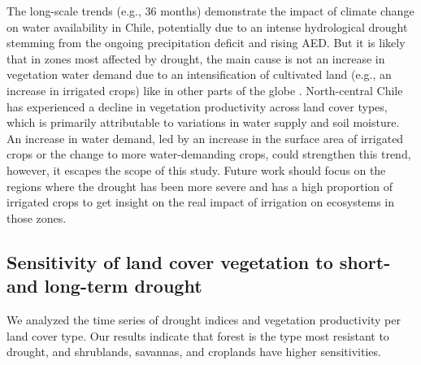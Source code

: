 \documentclass[
  authoryear,
  preprint,
  3p,
  onecolumn]{elsarticle}
\begin{document}
The long-scale trends (e.g., 36 months) demonstrate the impact of
climate change on water availability in Chile, potentially due to an
intense hydrological drought stemming from the ongoing precipitation
deficit and rising AED. But it is likely that in zones most affected by
drought, the main cause is not an increase in vegetation water demand
due to an intensification of cultivated land (e.g., an increase in
irrigated crops) like in other parts of the globe
\citep{Vicente-Serrano2020}. North-central Chile has experienced a
decline in vegetation productivity across land cover types, which is
primarily attributable to variations in water supply and soil moisture.
An increase in water demand, led by an increase in the surface area of
irrigated crops or the change to more water-demanding crops, could
strengthen this trend, however, it escapes the scope of this study.
Future work should focus on the regions where the drought has been more
severe and has a high proportion of irrigated crops to get insight on
the real impact of irrigation on ecosystems in those zones.

\hypertarget{sensitivity-of-land-cover-vegetation-to-short--and-long-term-drought}{%
\subsection{Sensitivity of land cover vegetation to short- and long-term
drought}\label{sensitivity-of-land-cover-vegetation-to-short--and-long-term-drought}}

We analyzed the time series of drought indices and vegetation
productivity per land cover type. Our results indicate that forest is
the type most resistant to drought, and shrublands, savannas, and
croplands have higher sensitivities.
\end{document}
